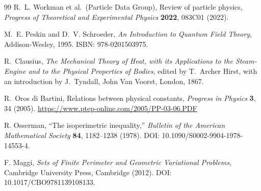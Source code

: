 \documentclass[aps,pra,preprint,longbibliography,nofootinbib]{revtex4-2}
\begin{document}
\begin{thebibliography}{99}
R.~L. Workman et al.\ (Particle Data Group),
Review of particle physics,
\textit{Progress of Theoretical and Experimental Physics}
\textbf{2022}, 083C01 (2022).

M.~E. Peskin and D.~V. Schroeder,
\textit{An Introduction to Quantum Field Theory},
Addison-Wesley, 1995.
ISBN: 978-0201503975.

R.~Clausius,
\textit{The Mechanical Theory of Heat, with its Applications to the
Steam-Engine and to the Physical Properties of Bodies},
edited by T.~Archer Hirst, with an introduction by J.~Tyndall,
John Van Voorst, London, 1867.

R.~Oros di Bartini,
Relations between physical constants,
\textit{Progress in Physics} \textbf{3}, 34 (2005).
\url{https://www.ptep-online.com/2005/PP-03-06.PDF}

R. Osserman,
``The isoperimetric inequality,''
\emph{Bulletin of the American Mathematical Society} \textbf{84},
1182--1238 (1978).
DOI: 10.1090/S0002-9904-1978-14553-4.

F. Maggi,
\emph{Sets of Finite Perimeter and Geometric Variational Problems},
Cambridge University Press, Cambridge (2012).
DOI: 10.1017/CBO9781139108133.

\end{thebibliography}
\end{document}
